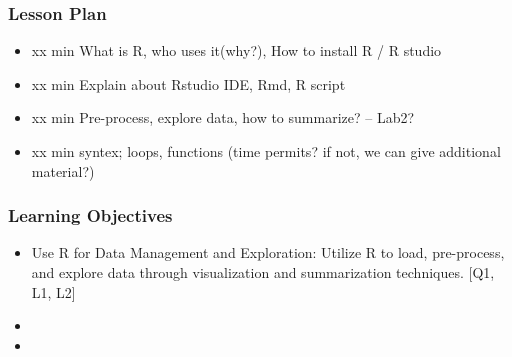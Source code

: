 

\begin{frame}
\frametitle{Lesson Plan}
\begin{itemize}
    \item xx min What is R, who uses it(why?), How to install R / R studio
    \item xx min Explain about Rstudio IDE, Rmd, R script 
    \item xx min Pre-process, explore data, how to summarize? -- Lab2?
    \item xx min syntex; loops, functions (time permits? if not, we can give additional material?)
\end{itemize}
\end{frame}


\begin{frame}
\frametitle{Learning Objectives}

\begin{itemize}
    \item Use R for Data Management and Exploration: Utilize R to load, pre-process, and explore data through visualization and summarization techniques. [Q1, L1, L2]
    \item 
    \item 
\end{itemize}
\end{frame}





